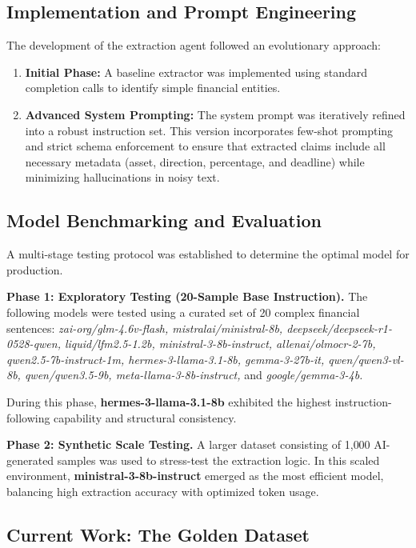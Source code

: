 \documentclass[a4paper,12pt]{report}
\begin{document}
\subsection{Implementation and Prompt Engineering}

The development of the extraction agent followed an evolutionary approach:
\begin{enumerate}
    \item \textbf{Initial Phase:} A baseline extractor was implemented using standard completion calls to identify simple financial entities.
    \item \textbf{Advanced System Prompting:} The system prompt was iteratively refined into a robust instruction set. This version incorporates few-shot prompting and strict schema enforcement to ensure that extracted claims include all necessary metadata (asset, direction, percentage, and deadline) while minimizing hallucinations in noisy text.
\end{enumerate}

\subsection{Model Benchmarking and Evaluation}

A multi-stage testing protocol was established to determine the optimal model for production.

\begin{sloppypar}
\textbf{Phase 1: Exploratory Testing (20-Sample Base Instruction).}
The following models were tested using a curated set of 20 complex financial sentences:
\textit{zai-org/glm-4.6v-flash, mistralai/ministral-8b, deepseek/deepseek-r1-0528-qwen, liquid/lfm2.5-1.2b, ministral-3-8b-instruct, allenai/olmocr-2-7b, qwen2.5-7b-instruct-1m, hermes-3-llama-3.1-8b, gemma-3-27b-it, qwen/qwen3-vl-8b, qwen/qwen3.5-9b, meta-llama-3-8b-instruct,} and \textit{google/gemma-3-4b.}
\end{sloppypar}

During this phase, \textbf{hermes-3-llama-3.1-8b} exhibited the highest instruction-following capability and structural consistency.

\textbf{Phase 2: Synthetic Scale Testing.}
A larger dataset consisting of 1{,}000 AI-generated samples was used to stress-test the extraction logic. In this scaled environment, \textbf{ministral-3-8b-instruct} emerged as the most efficient model, balancing high extraction accuracy with optimized token usage.

\subsection{Current Work: The Golden Dataset}
\end{document}

